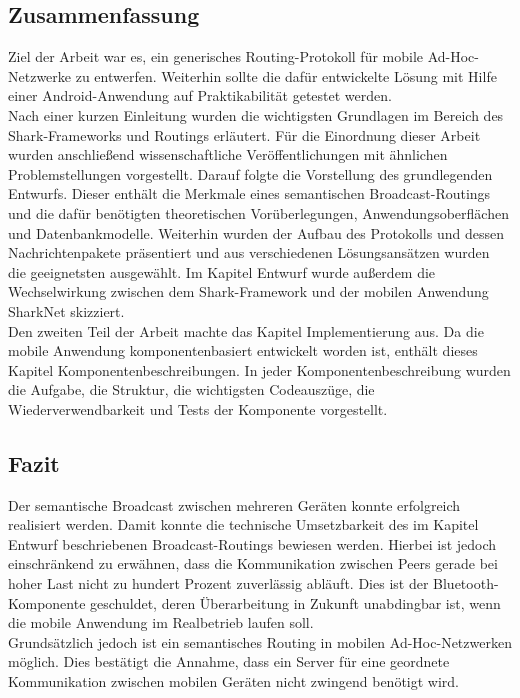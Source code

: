 \subsection{Zusammenfassung}
Ziel der Arbeit war es, ein generisches Routing-Protokoll für mobile Ad-Hoc-Netzwerke zu entwerfen. Weiterhin sollte die dafür entwickelte Lösung mit Hilfe einer Android-Anwendung auf Praktikabilität getestet werden. 
\\Nach einer kurzen Einleitung wurden die wichtigsten Grundlagen im Bereich des Shark-Frameworks und Routings erläutert. Für die Einordnung dieser Arbeit wurden an\-schlie\-ßend wissenschaftliche Veröffentlichungen mit ähnlichen Problemstellungen vorgestellt. Darauf folgte die Vorstellung des grundlegenden Entwurfs. Dieser enthält die Merkmale eines semantischen Broadcast-Routings und die dafür benötigten theoretischen Vor\-über\-le\-gun\-gen, Anwendungsoberflächen und Datenbankmodelle. Weiterhin wurden der Aufbau des Protokolls und dessen Nachrichtenpakete präsentiert und aus verschiedenen Lösungsansätzen wurden die geeignetsten ausgewählt. Im Kapitel Entwurf wurde außerdem die Wechselwirkung zwischen dem Shark-Framework und der mobilen Anwendung SharkNet skizziert. 
\\Den zweiten Teil der Arbeit machte das Kapitel Implementierung aus. Da die mobile Anwendung komponentenbasiert entwickelt worden ist, enthält dieses Kapitel Komponentenbeschreibungen. In jeder Komponentenbeschreibung wurden die Aufgabe, die Struktur, die wichtigsten Codeauszüge, die Wiederverwendbarkeit und Tests der Komponente vorgestellt. 
\subsection{Fazit}
Der semantische Broadcast zwischen mehreren Geräten konnte erfolgreich realisiert werden. Damit konnte die technische Umsetzbarkeit des im Kapitel Entwurf beschriebenen Broadcast-Routings bewiesen werden. Hierbei ist jedoch einschränkend zu erwähnen, dass die Kommunikation zwischen Peers gerade bei hoher Last nicht zu hundert Prozent zuverlässig abläuft. Dies ist der Bluetooth-Komponente geschuldet, deren Überarbeitung in Zukunft unabdingbar ist, wenn die mobile Anwendung im Realbetrieb laufen soll. 
\\Grundsätzlich jedoch ist ein semantisches Routing in mobilen Ad-Hoc-Netzwerken möglich. Dies bestätigt die Annahme, dass ein Server für eine geordnete Kommunikation zwischen mobilen Geräten nicht zwingend benötigt wird.
\newpage
